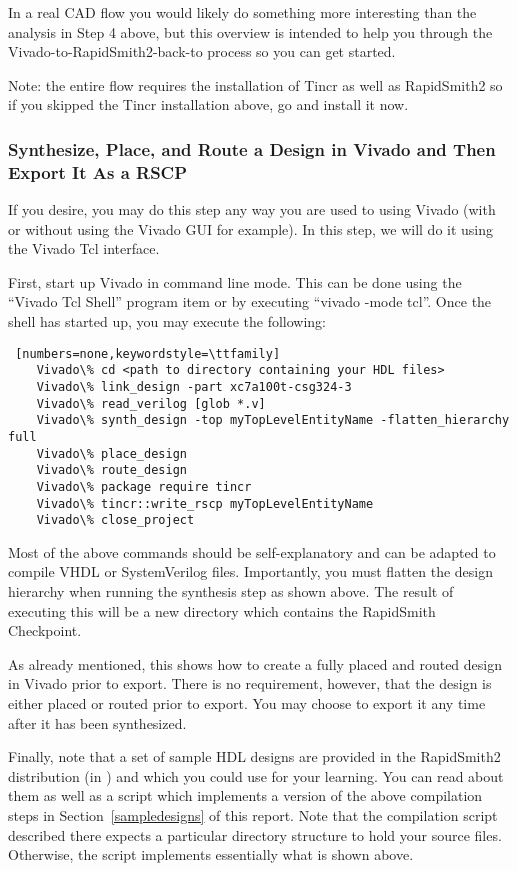 In a real CAD flow you would likely do something more interesting
than the analysis in Step 4 above, but this overview is intended to help you
through the Vivado-to-RapidSmith2-back-to process so you can get started.

Note: the entire flow requires the installation of Tincr as well as RapidSmith2 so if
you skipped the Tincr installation above, go and install it now.

\subsubsection{Synthesize, Place, and Route a Design in Vivado and Then Export
It As a RSCP} If you desire, you may do this step any way you are used to using
Vivado (with or without using the Vivado GUI for example).  In this step, we
will do it using the Vivado Tcl interface.

First, start up Vivado in command line mode.  This can be done using the
``Vivado Tcl Shell'' program item or by executing ``vivado -mode tcl''.  Once
the shell has started up, you may execute the following:
                
\begin{lstlisting} [numbers=none,keywordstyle=\ttfamily]
	Vivado\% cd <path to directory containing your HDL files>
	Vivado\% link_design -part xc7a100t-csg324-3
	Vivado\% read_verilog [glob *.v]
	Vivado\% synth_design -top myTopLevelEntityName -flatten_hierarchy full 
	Vivado\% place_design
	Vivado\% route_design
	Vivado\% package require tincr
	Vivado\% tincr::write_rscp myTopLevelEntityName
	Vivado\% close_project
\end{lstlisting}
Most of the above commands should be self-explanatory and can be adapted to
compile VHDL or SystemVerilog files.
Importantly,  you must flatten the design hierarchy when running
the synthesis step as shown above.  The result of executing this will be a new
directory which contains the RapidSmith Checkpoint.

As already mentioned, this shows how to create a fully placed and routed design
in Vivado prior to export.  There is no requirement, however, that the design is
either placed or routed prior to export.  You may choose to export it any time
after it has been synthesized.

Finally, note that a set of sample HDL designs are provided in the RapidSmith2
distribution (in ) and which you could use for your
learning.
You can read about them as well as a script which implements a version of the
above compilation steps in Section~\ref{sampledesigns} of this report.  Note
that the compilation script described there expects a particular directory
structure to hold your source files.  Otherwise, the script implements 
essentially what is shown above.


